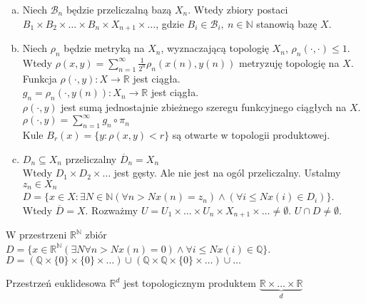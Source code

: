 \begin{dd} \hfill 
    \begin{enumerate}[(a)] 
        \item Niech $\mathcal B_n$ będzie przeliczalną bazą $X_n$. Wtedy zbiory postaci 
            $B_1 \times B_2 \times \ldots \times B_n \times X_{n+1} \times \ldots$, gdzie 
            $B_i \in \mathcal B_i,\ n \in \mathbb N$ stanowią bazę $X$. 
        \item Niech $\rho_n$ będzie metryką na $X_n$, wyznaczającą topologię $X_n$, 
            $\rho_n(\cdot,\cdot) \le 1$. \\
            Wtedy $\rho (x,y) = \sum\limits_{n=1}^\infty
            \frac{1}{2^n} \rho_n (x(n),y(n))$ metryzuję topologię na $X$. \\ 
            Funkcja $\rho(\cdot,y): X \to \mathbb R$ jest ciągła. \\ 
            $g_n=\rho_n (\cdot,y(n)): X_n \to \mathbb R$ jest ciągła.  \\ 
            $\rho(\cdot,y)$ jest sumą jednostajnie zbieżnego szeregu funkcyjnego ciągłych
            na $X$. $\rho(\cdot,y) = \sum\limits_{n=1}^\infty g_n \circ \pi_n$ \\ 
            Kule $B_r (x) = \{y: \rho (x,y) < r \}$ są otwarte w topologii produktowej.
        \item $D_n \subseteq X_n$ przeliczalny $\overline D_n = X_n$ \\ 
            Wtedy $D_1 \times D_2 \times \ldots $ jest gęsty. Ale nie jest na ogól przeliczalny. 
            Ustalmy $z_n \in X_n$ \\ 
            $D = \{ x \in X: \exists N \in \mathbb N (\forall n > N x(n) = z_n) \land 
            (\forall i \le N x(i) \in D_i) \}$. \\ 
            Wtedy $\overline D = X$. Rozważmy $U = U_1 \times \ldots \times U_n \times X_{n+1} \times 
            \ldots  \neq \emptyset$. $U \cap D \neq \emptyset$.
    \end{enumerate} 
\end{dd}
\begin{wn} 
    W przestrzeni $\mathbb R ^ \mathbb N$ zbiór  $D = \{x \in \mathbb R ^ \mathbb N 
    (\exists N \forall n > N x(n) = 0) \land \forall i \le N x(i) \in \mathbb Q \}$. \\ 
    $D = ( \mathbb Q \times \{0\} \times \{0\} \times \ldots) \cup 
        (\mathbb Q \times \mathbb Q \times \{0\} \times \ldots) \cup \ldots$
\end{wn} 
\begin{uw} 
    Przestrzeń euklidesowa $\mathbb R ^d$ jest topologicznym produktem $\underbrace{\mathbb R 
    \times \ldots \times \mathbb R}_{d}$
\end{uw} 
